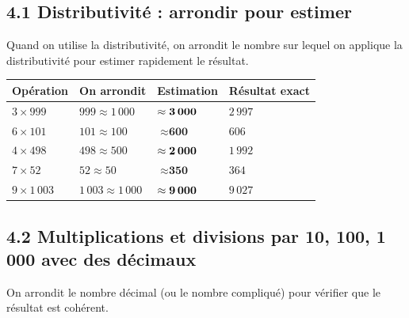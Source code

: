 \documentclass{exam}
\begin{document}
\subsection*{\textcolor{blue!60!black}{4.1 Distributivité : arrondir pour estimer}}

Quand on utilise la distributivité, on arrondit le nombre sur lequel on applique la distributivité pour estimer rapidement le résultat.

\begin{center}
\renewcommand{\arraystretch}{1.5}
\begin{tabular}{|>{\centering}p{3.5cm}|>{\centering}p{3.5cm}|>{\centering}p{3cm}|>{\centering\arraybackslash}p{3cm}|}
\hline
\rowcolor{gray!20}
\textbf{Opération} & \textbf{On arrondit} & \textbf{Estimation} & \textbf{Résultat exact} \\
\hline
$3 \times 999$ & $999 \approx 1\,000$ & $\approx \textbf{3\,000}$ & $2\,997$ \\ \hline
$6 \times 101$ & $101 \approx 100$ & $\approx \textbf{600}$ & $606$ \\ \hline
$4 \times 498$ & $498 \approx 500$ & $\approx \textbf{2\,000}$ & $1\,992$ \\ \hline
$7 \times 52$ & $52 \approx 50$ & $\approx \textbf{350}$ & $364$ \\ \hline
$9 \times 1\,003$ & $1\,003 \approx 1\,000$ & $\approx \textbf{9\,000}$ & $9\,027$ \\ \hline
\end{tabular}
\end{center}

\subsection*{\textcolor{blue!60!black}{4.2 Multiplications et divisions par 10, 100, 1\,000 avec des décimaux}}

On arrondit le nombre décimal (ou le nombre compliqué) pour vérifier que le résultat est cohérent.
\end{document}
